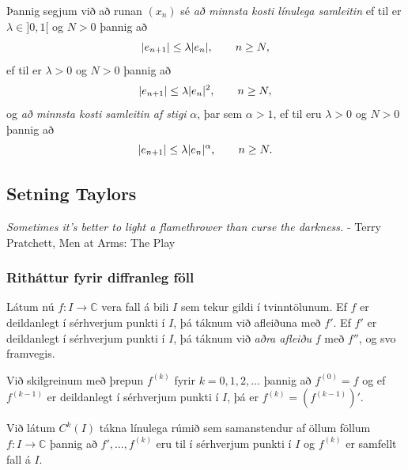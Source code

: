 \documentclass[a4paper,10pt,icelandic]{sphinxmanual}
\begin{document}
Þannig segjum við að runan \((x_n)\) sé \emph{að minnsta kosti línulega
samleitin} ef til er \(\lambda\in ]0,1[\) og \(N >0\) þannig að
\begin{gather}
\begin{split}|e_{n+1}|\leq \lambda |e_n|, \qquad n\geq N,\end{split}\notag
\end{gather}
ef til er \(\lambda>0\) og \(N>0\) þannig að
\begin{gather}
\begin{split}|e_{n+1}|\leq \lambda |e_n|^2, \qquad n\geq N,\end{split}\notag
\end{gather}
og \emph{að minnsta kosti samleitin af stigi} \(\alpha\), þar sem
\(\alpha> 1\), ef til eru \(\lambda>0\) og \(N>0\) þannig að
\begin{gather}
\begin{split}|e_{n+1}|\leq \lambda |e_n|^\alpha, \qquad n\geq N.\end{split}\notag
\end{gather}

\subsection{Setning Taylors}
\label{kafli01:setning-taylors}
\emph{Sometimes it's better to light a flamethrower than curse the darkness.}
- Terry Pratchett, Men at Arms: The Play


\subsubsection{Ritháttur fyrir diffranleg föll}
\label{kafli01:index-1}\label{kafli01:rithattur-fyrir-diffranleg-foll}
Látum nú \(f : I \to {\mathbb  C}\) vera fall á bili \(I\) sem
tekur gildi í tvinntölunum. Ef \(f\) er deildanlegt í sérhverjum
punkti í \(I\), þá táknum við afleiðuna með \(f'\). Ef
\(f'\) er deildanlegt í sérhverjum punkti í \(I\), þá táknum við
\emph{aðra afleiðu} \(f\) með \(f''\), og svo framvegis.

Við skilgreinum með þrepun \(f^{(k)}\) fyrir \(k = 0,1,2,
\ldots\) þannig að \(f^{(0)} = f\) og ef \(f^{(k-1)}\) er
deildanlegt í sérhverjum punkti í \(I\), þá er
\(f^{(k)} = (f^{(k-1)})'\).

Við látum \(C^{k}(I)\) tákna línulega rúmið sem samanstendur af
öllum föllum \(f :
I \to {\mathbb  C}\) þannig að \(f', \ldots, f^{(k)}\) eru til í
sérhverjum punkti í \(I\) og \(f^{(k)}\) er samfellt fall á
\(I\).
\end{document}

